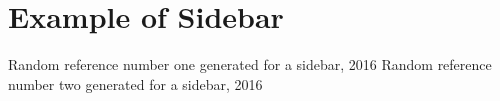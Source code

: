 \section[Example of Sidebar]{Example of Sidebar}
\label{sb:example}

\begin{thebibliography}{10}
	 Random reference number one generated for a sidebar, 2016
	 Random reference number two generated for a sidebar, 2016
\end{thebibliography}